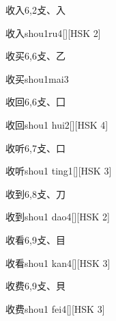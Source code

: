 \begin{entry}{收入}{6,2}{⽁、⼊}
  \begin{phonetics}{收入}{shou1ru4}[][HSK 2]
  \end{phonetics}
\end{entry}

\begin{entry}{收买}{6,6}{⽁、⼄}
  \begin{phonetics}{收买}{shou1mai3}
  \end{phonetics}
\end{entry}

\begin{entry}{收回}{6,6}{⽁、⼞}
  \begin{phonetics}{收回}{shou1 hui2}[][HSK 4]
  \end{phonetics}
\end{entry}

\begin{entry}{收听}{6,7}{⽁、⼝}
  \begin{phonetics}{收听}{shou1 ting1}[][HSK 3]
  \end{phonetics}
\end{entry}

\begin{entry}{收到}{6,8}{⽁、⼑}
  \begin{phonetics}{收到}{shou1 dao4}[][HSK 2]
  \end{phonetics}
\end{entry}

\begin{entry}{收看}{6,9}{⽁、⽬}
  \begin{phonetics}{收看}{shou1 kan4}[][HSK 3]
  \end{phonetics}
\end{entry}

\begin{entry}{收费}{6,9}{⽁、⾙}
  \begin{phonetics}{收费}{shou1 fei4}[][HSK 3]
  \end{phonetics}
\end{entry}

